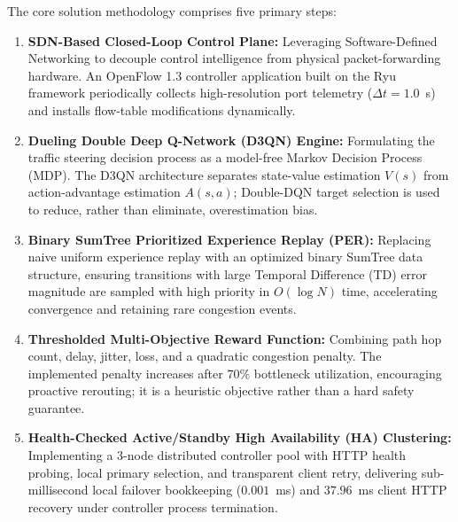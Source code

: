 \documentclass[12pt,a4paper,oneside]{report}
\begin{document}
The core solution methodology comprises five primary steps:
\begin{enumerate}
    \item \textbf{SDN-Based Closed-Loop Control Plane:} Leveraging Software-Defined Networking to decouple control intelligence from physical packet-forwarding hardware. An OpenFlow 1.3 controller application built on the Ryu framework periodically collects high-resolution port telemetry ($\Delta t = 1.0$~s) and installs flow-table modifications dynamically.
    \item \textbf{Dueling Double Deep Q-Network (D3QN) Engine:} Formulating the traffic steering decision process as a model-free Markov Decision Process (MDP). The D3QN architecture separates state-value estimation $V(s)$ from action-advantage estimation $A(s,a)$; Double-DQN target selection is used to reduce, rather than eliminate, overestimation bias.
    \item \textbf{Binary SumTree Prioritized Experience Replay (PER):} Replacing naive uniform experience replay with an optimized binary SumTree data structure, ensuring transitions with large Temporal Difference (TD) error magnitude are sampled with high priority in $O(\log N)$ time, accelerating convergence and retaining rare congestion events.
    \item \textbf{Thresholded Multi-Objective Reward Function:} Combining path hop count, delay, jitter, loss, and a quadratic congestion penalty. The implemented penalty increases after 70\% bottleneck utilization, encouraging proactive rerouting; it is a heuristic objective rather than a hard safety guarantee.
    \item \textbf{Health-Checked Active/Standby High Availability (HA) Clustering:} Implementing a 3-node distributed controller pool with HTTP health probing, local primary selection, and transparent client retry, delivering sub-millisecond local failover bookkeeping ($0.001$~ms) and $37.96$~ms client HTTP recovery under controller process termination.
\end{enumerate}
\end{document}
